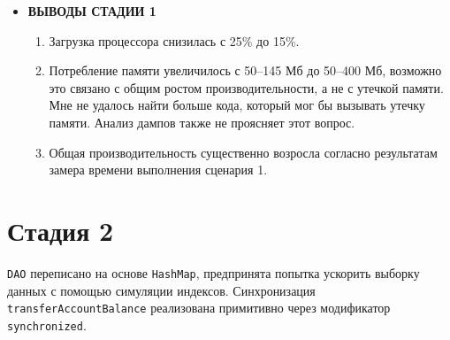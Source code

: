 \documentclass{article}
\begin{document}
\begin{itemize}
		\item \textbf{ВЫВОДЫ СТАДИИ 1}
		\begin{enumerate}
			\item Загрузка процессора снизилась с 25\% до 15\%.
			\item Потребление памяти увеличилось с 50--145 Мб до 50--400 Мб, возможно это связано с общим ростом производительности, а не с утечкой памяти. Мне не удалось найти больше кода, который мог бы вызывать утечку памяти. 
			Анализ дампов также не проясняет этот вопрос.
			\item Общая производительность существенно возросла согласно результатам замера времени выполнения сценария 1.
		\end{enumerate}
	\end{itemize}
	

\section*{Стадия 2}

 \texttt{DAO} переписано на основе \texttt{HashMap}, предпринята попытка ускорить выборку данных с помощью симуляции индексов.
 Синхронизация \texttt{transferAccountBalance} реализована примитивно через модификатор \texttt{synchronized}.
\end{document}
